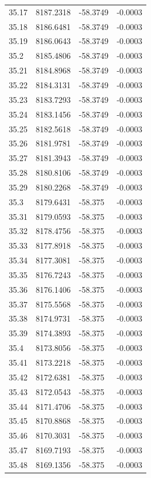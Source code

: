 \begin{table}[H]
\begin{tabular}{llll}
35.17 & 8187.2318 & -58.3749 & -0.0003 \\
35.18 & 8186.6481 & -58.3749 & -0.0003 \\
35.19 & 8186.0643 & -58.3749 & -0.0003 \\
35.2 & 8185.4806 & -58.3749 & -0.0003 \\
35.21 & 8184.8968 & -58.3749 & -0.0003 \\
35.22 & 8184.3131 & -58.3749 & -0.0003 \\
35.23 & 8183.7293 & -58.3749 & -0.0003 \\
35.24 & 8183.1456 & -58.3749 & -0.0003 \\
35.25 & 8182.5618 & -58.3749 & -0.0003 \\
35.26 & 8181.9781 & -58.3749 & -0.0003 \\
35.27 & 8181.3943 & -58.3749 & -0.0003 \\
35.28 & 8180.8106 & -58.3749 & -0.0003 \\
35.29 & 8180.2268 & -58.3749 & -0.0003 \\
35.3 & 8179.6431 & -58.375 & -0.0003 \\
35.31 & 8179.0593 & -58.375 & -0.0003 \\
35.32 & 8178.4756 & -58.375 & -0.0003 \\
35.33 & 8177.8918 & -58.375 & -0.0003 \\
35.34 & 8177.3081 & -58.375 & -0.0003 \\
35.35 & 8176.7243 & -58.375 & -0.0003 \\
35.36 & 8176.1406 & -58.375 & -0.0003 \\
35.37 & 8175.5568 & -58.375 & -0.0003 \\
35.38 & 8174.9731 & -58.375 & -0.0003 \\
35.39 & 8174.3893 & -58.375 & -0.0003 \\
35.4 & 8173.8056 & -58.375 & -0.0003 \\
35.41 & 8173.2218 & -58.375 & -0.0003 \\
35.42 & 8172.6381 & -58.375 & -0.0003 \\
35.43 & 8172.0543 & -58.375 & -0.0003 \\
35.44 & 8171.4706 & -58.375 & -0.0003 \\
35.45 & 8170.8868 & -58.375 & -0.0003 \\
35.46 & 8170.3031 & -58.375 & -0.0003 \\
35.47 & 8169.7193 & -58.375 & -0.0003 \\
35.48 & 8169.1356 & -58.375 & -0.0003 \\

\end{tabular}
\end{table}
